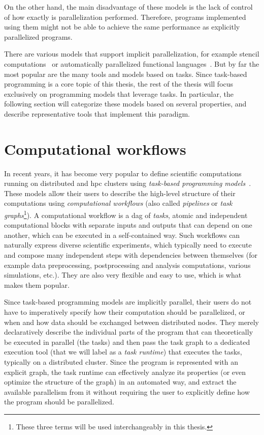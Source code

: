 On the other hand, the main disadvantage of these models is the lack of control of how exactly is
parallelization performed. Therefore, programs implemented using them might not be able to achieve
the same performance as explicitly parallelized programs.

There are various models that support implicit parallelization, for example stencil
computations~\cite{stencil} or automatically parallelized functional
languages~\cite{parallel_haskell}. But by far the most popular are the many tools and models based
on tasks. Since task-based programming is a core topic of this thesis, the rest of the thesis will
focus exclusively on programming models that leverage tasks. In particular, the following section
will categorize these models based on several properties, and describe representative tools that
implement this paradigm.

\section{Computational workflows}
In recent years, it has become very popular to define scientific computations running on distributed
and \gls{hpc} clusters using \emph{task-based programming models}~\cite{pegasus,workflows1,workflows_at_scale}. These
models allow their users to describe the high-level structure of their computations using
\emph{computational workflows} (also called \emph{pipelines} or \emph{task graphs}\footnote{These three terms will be used interchangeably in this thesis.}). A computational workflow is a \gls{dag} of
\emph{tasks}, atomic and independent computational blocks with separate inputs and
outputs that can depend on one another, which can be executed in a self-contained way. Such
workflows can naturally express diverse scientific experiments, which typically need to execute and
compose many independent steps with dependencies between themselves (for example data
preprocessing, postprocessing and analysis computations, various simulations, etc.). They are also
very flexible and easy to use, which is what makes them popular.

Since task-based programming models are implicitly parallel, their users do not have to
imperatively specify how their computation should be parallelized, or when and how data should be
exchanged between distributed nodes. They merely declaratively describe the individual parts of the
program that can theoretically be executed in parallel (the tasks) and then pass the task graph to
a dedicated execution tool (that we will label as a \emph{task runtime}) that executes the
tasks, typically on a distributed cluster. Since the program is represented with an explicit graph,
the task runtime can effectively analyze its properties (or even optimize the structure of the
graph) in an automated way, and extract the available parallelism from it without requiring the
user to explicitly define how the program should be parallelized.

